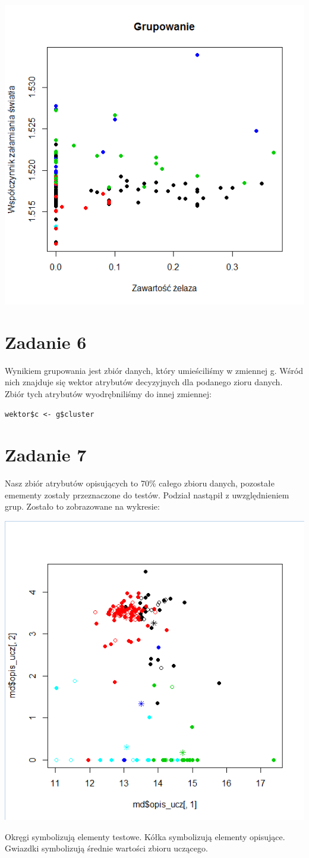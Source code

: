 \documentclass[a4paper,12pt,twoside]{article}
\begin{document}
\begin{center}
\includegraphics[width=.75\textwidth]{img/grupowanie_zelazo.png}
\end{center}

\section{Zadanie 6}
Wynikiem grupowania jest zbiór danych, który umieściliśmy w zmiennej g. Wśród nich znajduje się wektor atrybutów decyzyjnych dla podanego zioru danych. Zbiór tych atrybutów wyodrębniliśmy do innej zmiennej:
\begin{lstlisting}
wektor$c <- g$cluster
\end{lstlisting}
\section{Zadanie 7}
Nasz zbiór atrybutów opisujących to 70\% całego zbioru danych, pozostałe emementy zostały przeznaczone do testów. Podział nastąpił z uwzględnieniem grup. Zostało to zobrazowane na wykresie:
\begin{center}
\includegraphics[width=.75\textwidth]{img/zbiory.png}
\end{center}
Okręgi symbolizują elementy testowe. \newline
Kółka symbolizują elementy opisujące. \newline
Gwiazdki symbolizują średnie wartości zbioru uczącego.
\end{document}
